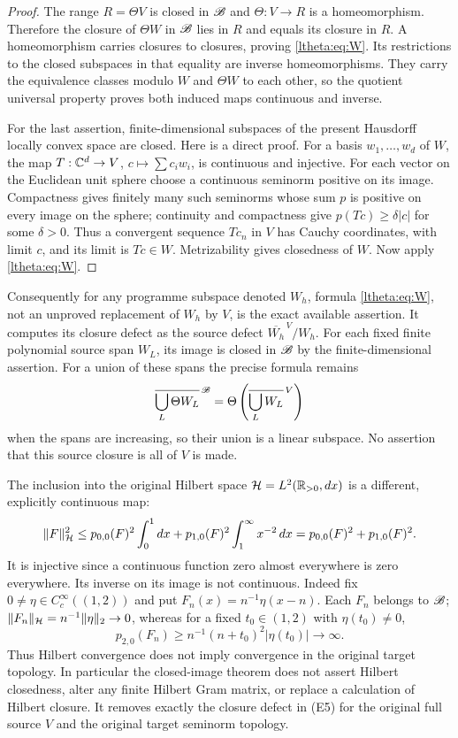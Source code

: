 \documentclass[11pt]{article}
\begin{document}
\begin{proof}
The range $R=\Theta V$ is closed in $\mathscr B$ and $\Theta:V\to R$ is a
homeomorphism. Therefore the closure of $\Theta W$ in $\mathscr B$ lies in
$R$ and equals its closure in $R$. A homeomorphism carries closures
to closures, proving \eqref{ltheta:eq:W}. Its restrictions to the closed
subspaces in that equality are inverse homeomorphisms. They carry
the equivalence classes modulo $W$ and $\Theta W$ to each other,
so the quotient universal property proves both induced maps
continuous and inverse.

For the last assertion, finite-dimensional subspaces of the present
Hausdorff locally convex space are closed. Here is a direct proof.
For a basis $w_1,\ldots,w_d$ of $W$, the map
$T:\mathbb C^d\to V$, $c\mapsto\sum c_iw_i$, is continuous and injective.
For each vector on the Euclidean unit sphere choose a continuous
seminorm positive on its image. Compactness gives finitely many
such seminorms whose sum $p$ is positive on every image on the
sphere; continuity and compactness give $p(Tc)\geq\delta|c|$ for
some $\delta>0$. Thus a convergent sequence $Tc_n$ in $V$ has
Cauchy coordinates, with limit $c$, and its limit is $Tc\in W$.
Metrizability gives closedness of $W$. Now apply \eqref{ltheta:eq:W}.
\end{proof}

Consequently for any programme subspace denoted $W_h$, formula
\eqref{ltheta:eq:W}, not an unproved replacement of $W_h$ by $V$, is the
exact available assertion. It computes its closure defect as the
source defect $\overline{W_h}^{\,V}/W_h$. For each fixed finite
polynomial source span $W_L$, its image is closed in $\mathscr B$ by the
finite-dimensional assertion. For a union of these spans the precise
formula remains
\[
 \overline{\bigcup_L\Theta W_L}^{\,\mathscr B}
    =\Theta\left(\overline{\bigcup_L W_L}^{\,V}\right)
\]
when the spans are increasing, so their union is a linear subspace.
No assertion that this source closure is all of $V$ is made.

The inclusion into the original Hilbert space
$\mathcal H=L^2(\mathbb R_{>0},dx)$ is a different, explicitly continuous map:
\begin{equation}\label{ltheta:eq:Hilbert}
 \|F\|_{\mathcal H}^2
 \leq p_{0,0}(F)^2\int_0^1dx
          +p_{1,0}(F)^2\int_1^\infty x^{-2}\,dx
 =p_{0,0}(F)^2+p_{1,0}(F)^2.
\end{equation}
It is injective since a continuous function zero almost everywhere
is zero everywhere. Its inverse on its image is not continuous.
Indeed fix $0\ne\eta\in C_c^\infty((1,2))$ and put
$F_n(x)=n^{-1}\eta(x-n)$. Each $F_n$ belongs to $\mathscr B$;
$\|F_n\|_{\mathcal H}=n^{-1}\|\eta\|_2\to0$, whereas for a fixed
$t_0\in(1,2)$ with $\eta(t_0)\ne0$,
\[
 p_{2,0}(F_n)\geq n^{-1}(n+t_0)^2|\eta(t_0)|\longrightarrow\infty.
\]
Thus Hilbert convergence does not imply convergence in the original
target topology. In particular the closed-image theorem does not
assert Hilbert closedness, alter any finite Hilbert Gram matrix, or
replace a calculation of Hilbert closure. It removes exactly the
closure defect in (E5) for the original full source $V$ and the
original target seminorm topology.
\end{document}

